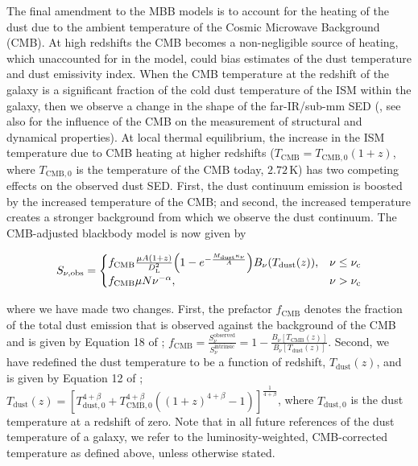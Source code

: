 The final amendment to the MBB models is to account for the heating of the dust due to the ambient temperature of the Cosmic Microwave Background (CMB). At high redshifts the CMB becomes a non-negligible source of heating, which unaccounted for in the model, could bias estimates of the dust temperature and dust emissivity index. When the CMB temperature at the redshift of the galaxy is a significant fraction of the cold dust temperature of the ISM within the galaxy, then we observe a change in the shape of the far-IR/sub-mm SED (\citealt{daCunha_2013}, see also \citealt{Zhang_2016} for the influence of the CMB on the measurement of structural and dynamical properties). At local thermal equilibrium, the increase in the ISM temperature due to CMB heating at higher redshifts ($T_{\textrm{CMB}} = T_{\textrm{CMB}, 0}(1+z)$, where $T_{\textrm{CMB}, 0}$ is the temperature of the CMB today, $2.72\,$K) has two competing effects on the observed dust SED. First, the dust continuum emission is boosted by the increased temperature of the CMB; and second, the increased temperature creates a stronger background from which we observe the dust continuum. The CMB-adjusted blackbody model is now given by 

\begin{equation}
	S_{\nu, \textrm{obs}} =  
	\begin{cases}
		f_{\textrm{CMB}}\frac{\mu A (1+z)}{D_{\rm L}^2} \Big(1- e^{-\frac{M_{\textrm{dust}}\kappa_\nu}{A}}\Big) B_\nu(T_{\textrm{dust}}(z)), & \nu \le \nu_{\rm c} \\
		f_{\textrm{CMB}} \mu N \nu^{-\alpha}, & \nu > \nu_{\rm c} \\
	\end{cases}
	\label{eq:modified_blackbody_general_opacity_a_cmb}
\end{equation}

\noindent where we have made two changes. First, the prefactor $f_{\textrm{CMB}}$ denotes the fraction of the total dust emission that is observed against the background of the CMB and is given by Equation 18 of \citealt{daCunha_2013}; $f_{\textrm{CMB}} = \frac{S_\nu^{\textrm{observed}}}{S_\nu^{\textrm{intrinsic}}} = 1 - \frac{B_\nu[T_{\textrm{CMB}}(z)]}{B_\nu[T_{\textrm{dust}}(z)]}$. Second, we have redefined the dust temperature to be a function of redshift, $T_{\textrm{dust}}(z)$, and is given by Equation 12 of \citealt{daCunha_2013}; $T_{\textrm{dust}}(z) = [T_{\textrm{dust}, 0}^{4+\beta} + T_{\textrm{CMB}, 0}^{4+\beta} ((1+z)^{4+\beta} - 1)]^{\frac{1}{4+\beta}}$, where $T_{\textrm{dust}, 0}$ is the dust temperature at a redshift of zero. Note that in all future references of the dust temperature of a galaxy, we refer to the luminosity-weighted, CMB-corrected temperature as defined above, unless otherwise stated.

